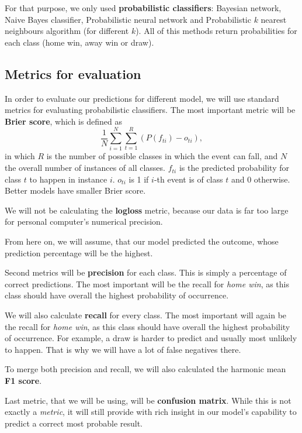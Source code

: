 \documentclass[conference]{IEEEtran}
\begin{document}
For that purpose, we only used \textbf{probabilistic classifiers}: Bayesian network, Naive Bayes classifier, Probabilistic neural 
network and Probabilistic $k$ nearest neighbours algorithm (for different $k$). All of this methods return probabilities for each
class (home win, away win or draw).

\subsection{Metrics for evaluation}

In order to evaluate our predictions for different model, we will use standard metrics for evaluating probabilistic classifiers. 
The most important metric will be \textbf{Brier score}, which is defined as 
$$\frac{1}{N} \sum_{i=1}^{N} \sum_{t=1}^{R} {(P(f_{ti}) - o_{ti})},$$ in which $R$ is the number of possible classes in which the
event can fall, and $N$ the overall number of instances of all classes. $f_{ti}$ is the predicted probability for class $t$ to 
happen in instance $i$. $o_{ti}$ is 1 if $i$-th event is of class $t$ and 0 otherwise. Better models have smaller Brier score.

We will not be calculating the \textbf{logloss} metric, because our data is far too large for personal computer's numerical 
precision.

From here on, we will assume, that our model predicted the outcome, whose prediction percentage will be the highest. 

Second metrics will be \textbf{precision} for each class. This is simply a percentage of correct predictions. The most important
will be the recall for \textit{home win}, as this class should have overall the highest probability of occurrence.

We will also calculate \textbf{recall} for every class. The most important will again be the recall for \textit{home win}, as 
this class should have overall the highest probability of occurrence. For example, a draw is harder to predict and usually 
most unlikely to happen. That is why we will have a lot of false negatives there.

To merge both precision and recall, we will also calculated the harmonic mean \textbf{F1 score}.

Last metric, that we will be using, will be \textbf{confusion matrix}. While this is not exactly a \textit{metric}, it will 
still provide with rich insight in our model's capability to predict a correct most probable result.
\end{document}
